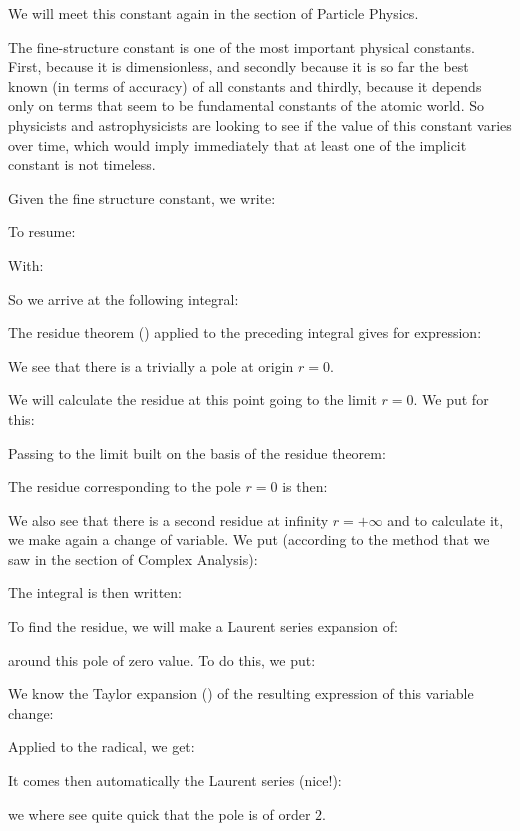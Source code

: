 	We will meet this constant again in the section of Particle Physics.
	\begin{tcolorbox}[title=Remark,colframe=black,arc=10pt]
	The fine-structure constant is one of the most important physical constants. First, because it is dimensionless, and secondly because it is so far the best known (in terms of accuracy) of all constants and thirdly, because it depends only on terms that seem to be fundamental constants of the atomic world. So physicists and astrophysicists are looking to see if the value of this constant varies over time, which would imply immediately that at least one of the implicit constant is not timeless.
	\end{tcolorbox}
	Given the fine structure constant, we write:
	
	To resume:
	
	With:
	
	So we arrive at the following integral:
	
	The residue theorem () applied to the preceding integral gives for expression:
	
	We see that there is a trivially a pole at origin $r=0$.

	We will calculate the residue at this point going to the limit $r=0$. We put for this:
	
	Passing to the limit built on the basis of the residue theorem:
	
	The residue corresponding to the pole $r=0$ is then:
	
	We also see that there is a second residue at infinity $r=+\infty$ and to calculate it, we make again a change of variable. We put (according to the method that we saw in the section of Complex  Analysis):
	
	The integral is then written:
	
	To find the residue, we will make a Laurent series expansion of:
	
	around this pole of zero value. To do this, we put:
	
	We know the Taylor expansion () of the resulting expression of this variable change:
	
	Applied to the radical, we get:
	
	It comes then automatically the Laurent series (nice!):
	
	we where see quite quick that the pole is of order $2$.
	
